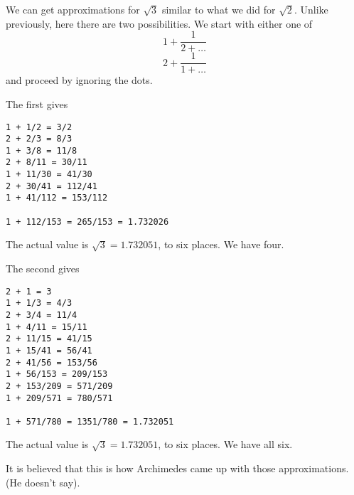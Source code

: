 \documentclass[11pt, oneside]{article}
\begin{document}
We can get approximations for $\sqrt{3}$ similar to what we did for $\sqrt{2}$.  Unlike previously, here there are two possibilities.  We start with either one of
\[ 1 + \frac{1}{2 + \dots} \]
\[ 2 + \frac{1}{1 + \dots} \]
and proceed by ignoring the dots.

The first gives
\begin{verbatim}
1 + 1/2 = 3/2
2 + 2/3 = 8/3
1 + 3/8 = 11/8
2 + 8/11 = 30/11
1 + 11/30 = 41/30
2 + 30/41 = 112/41
1 + 41/112 = 153/112

1 + 112/153 = 265/153 = 1.732026
\end{verbatim}

The actual value is $\sqrt{3} = 1.732051$, to six places.  We have four.

The second gives
\begin{verbatim}
2 + 1 = 3
1 + 1/3 = 4/3
2 + 3/4 = 11/4
1 + 4/11 = 15/11
2 + 11/15 = 41/15
1 + 15/41 = 56/41
2 + 41/56 = 153/56
1 + 56/153 = 209/153
2 + 153/209 = 571/209
1 + 209/571 = 780/571

1 + 571/780 = 1351/780 = 1.732051
\end{verbatim}

The actual value is $\sqrt{3} = 1.732051$, to six places.  We have all six.

It is believed that this is how Archimedes came up with those approximations.  (He doesn't say).
\end{document}
